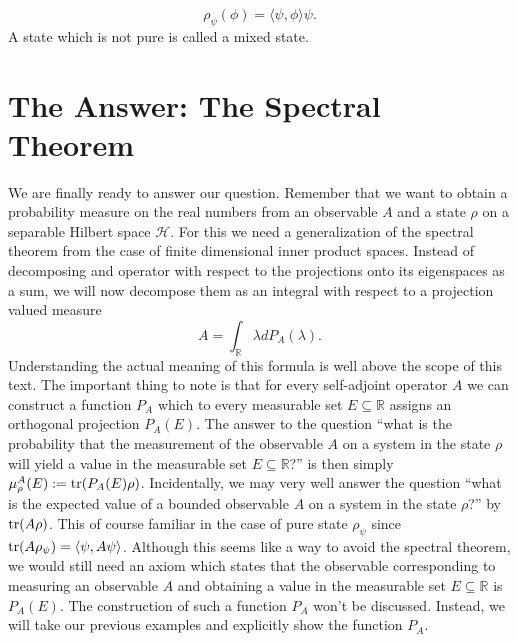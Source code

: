 \documentclass{article}
\begin{document}
\begin{equation}
\rho_\psi(\phi)=\langle \psi,\phi\rangle\psi.
\end{equation}
A state which is not pure is called a mixed state.

\section{The Answer: The Spectral Theorem}

We are finally ready to answer our question. Remember that we want to obtain a probability measure on the real numbers from an observable $A$ and a state $\rho$ on a separable Hilbert space $\mathcal{H}$. For this we need a generalization of the spectral theorem from the case of finite dimensional inner product spaces. Instead of decomposing and operator with respect to the projections onto its eigenspaces as a sum, we will now decompose them as an integral with respect to a projection valued measure
\begin{equation}\label{eq:spectral_theorem}
A=\int_\mathbb{R}\lambda dP_A(\lambda).
\end{equation}
Understanding the actual meaning of this formula is well above the scope of this text. The important thing to note is that for every self-adjoint operator $A$ we can construct a function $P_A$ which to every measurable set $E\subseteq\mathbb{R}$ assigns an orthogonal projection $P_A(E)$. The answer to the question ``what is the probability that the measurement of the observable $A$ on a system in the state $\rho$ will yield a value in the measurable set $E\subseteq\mathbb{R}$?'' is then simply $\mu^A_\rho(E):=\tr(P_A(E)\rho)$. Incidentally, we may very well answer the question ``what is the expected value of a bounded observable $A$ on a system in the state $\rho$?'' by $\tr(A\rho)$. This of course familiar in the case of pure state $\rho_\psi$ since $\tr(A\rho_\psi)=\langle\psi,A\psi\rangle$. Although this seems like a way to avoid the spectral theorem, we would still need an axiom which states that the observable corresponding to measuring an observable $A$ and obtaining a value in the measurable set $E\subseteq\mathbb{R}$ is $P_A(E)$. The construction of such a function $P_A$ won't be discussed. Instead, we will take our previous examples and explicitly show the function $P_A$.
\end{document}
